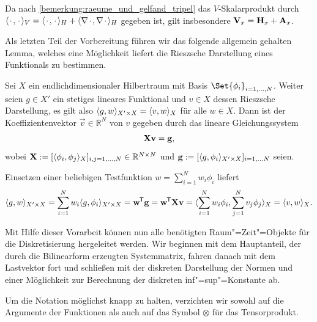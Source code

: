 \documentclass[../main.tex]{subfiles}
\begin{document}
Da nach \cref{bemerkung:raeume_und_gelfand_tripel} das $V$-Skalarprodukt durch $\langle{\mkern2mu\cdot\mkern2mu},{\mkern2mu\cdot\mkern2mu}\rangle_{V} = \langle{\mkern2mu\cdot\mkern2mu},{\mkern2mu\cdot\mkern2mu}\rangle_{H} + \langle\nabla{\mkern2mu\cdot\mkern2mu},\nabla{\mkern2mu\cdot\mkern2mu}\rangle_{H}$ gegeben ist, gilt insbesondere $\mathbf{V}_{x} = \mathbf{H}_{x} + \mathbf{A}_{x}$.

Als letzten Teil der Vorbereitung führen wir das folgende allgemein gehalten Lemma, welches eine Möglichkeit liefert die Rieszsche Darstellung eines Funktionals zu bestimmen.

\begin{Lemma}\label{lemma:berechnung_der_rieszschen_darstellung}
    Sei $X$ ein endlichdimensionaler Hilbertraum mit Basis $\Set{ \phi_{i} }_{i = 1, \dots, N }$.
    Weiter seien $g \in X'$ ein stetiges lineares Funktional und $v \in X$ dessen Rieszsche Darstellung, es gilt also $\langle g,w\rangle_{X' \times X} = \langle v,w\rangle_{X}$ für alle $w \in X$.
    Dann ist der Koeffizientenvektor $\vec{v} \in \mathbb{R}^{N}$ von $v$ gegeben durch das lineare Gleichungssystem
    \begin{equation}
        \mathbf{X} \mathbf{v} = \mathbf{g},
    \end{equation}
    wobei $\mathbf{X} := [\langle\phi_{i},\phi_{j}\rangle_{X}]_{i,j = 1, \dots, N} \in \mathbb{R}^{N \times N}$ und $\mathbf{g} := [\langle g,\phi_{i}\rangle_{X' \times X}]_{i = 1, \dots N}$ seien.

    \begin{Beweis}
        Einsetzen einer beliebigen Testfunktion $w = \sum_{i = 1}^{N} w_{i} \phi_{i}$ liefert
        \begin{equation}
            \langle g,w\rangle_{X' \times X}
            = \sum_{i = 1}^{N} w_i \langle g,\phi_{i}\rangle_{X' \times X}
            = \mathbf{w}^{\mkern-1.5mu\mathsf{T}} \mathbf{g}
            = \mathbf{w}^{\mkern-1.5mu\mathsf{T}} \mathbf{X} \mathbf{v}
            = \langle\sum_{i = 1}^{N} w_i \phi_{i},\sum_{j = 1}^{N} v_j \phi_{j}\rangle_{X}
            = \langle v,w\rangle_{X}.
        \end{equation}
    \end{Beweis}
\end{Lemma}

Mit Hilfe dieser Vorarbeit können nun alle benötigten Raum"=Zeit"=Objekte für die Diskretisierung hergeleitet werden.
Wir beginnen mit dem Hauptanteil, der durch die Bilinearform erzeugten Systemmatrix, fahren danach mit dem Lastvektor fort und schließen mit der diskreten Darstellung der Normen und einer Möglichkeit zur Berechnung der diskreten inf"=sup"=Konstante ab.

Um die Notation möglichst knapp zu halten, verzichten wir sowohl auf die Argumente der Funktionen als auch auf das Symbol $\otimes$ für das Tensorprodukt.
\end{document}
